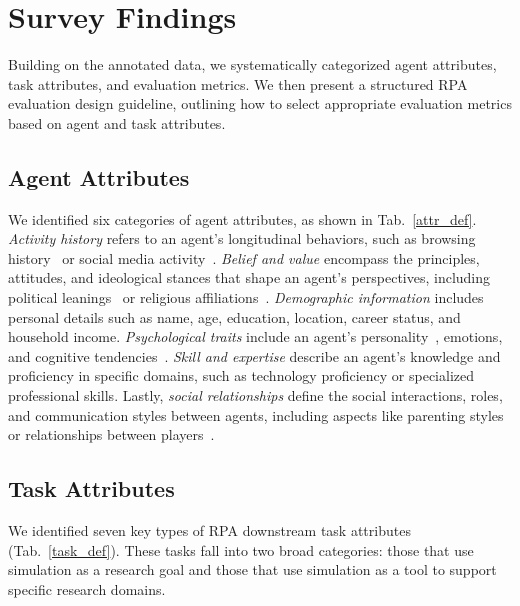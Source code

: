 \section{Survey Findings}

Building on the annotated data, we systematically categorized agent attributes, task attributes, and evaluation metrics. 
We then present a structured RPA evaluation design guideline, outlining how to select appropriate evaluation metrics based on agent and task attributes.






\subsection{Agent Attributes}
We identified six categories of agent attributes, as shown in Tab.~\ref{attr_def}. 
\textit{Activity history} refers to an agent's longitudinal behaviors, such as browsing history~\cite{10.1145/3613904.3642363} or social media activity~\cite{Navarro2024DesigningRE}. 
\textit{Belief and value} encompass the principles, attitudes, and ideological stances that shape an agent's perspectives, including political leanings~\cite{Mou2024UnveilingTT} or religious affiliations~\cite{lv2024coggpt}. 
\textit{Demographic information} includes personal details such as name, age, education, location, career status, and household income. 
\textit{Psychological traits} include an agent's personality~\cite{NEURIPS2023_21f7b745}, emotions, and cognitive tendencies~\cite{castricato2024personareproducibletestbedpluralistic}. 
\textit{Skill and expertise} describe an agent's knowledge and proficiency in specific domains, such as technology proficiency or specialized professional skills. 
Lastly, \textit{social relationships} define the social interactions, roles, and communication styles between agents, including aspects like parenting styles~\cite{ye2024simulating} or relationships between players~\cite{ge2024scaling}.



\subsection{Task Attributes}
We identified seven key types of RPA downstream task attributes (Tab.~\ref{task_def}). These tasks fall into two broad categories: those that use simulation as a research goal and those that use simulation as a tool to support specific research domains.


